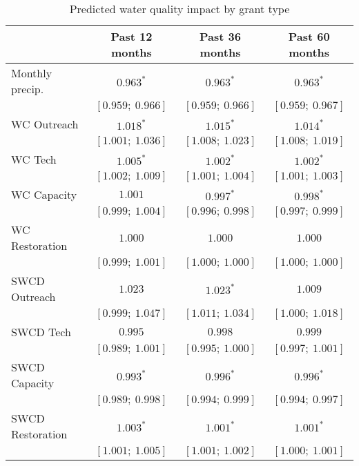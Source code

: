 
\begin{table}
\caption{Predicted water quality impact by grant type}
\begin{center}
\begin{tabular}{l c c c }
\hline
                       & Past 12 months & Past 36 months & Past 60 months \\
\hline
Monthly precip.        & $0.963^{*}$       & $0.963^{*}$       & $0.963^{*}$       \\
                       & $[0.959;\ 0.966]$ & $[0.959;\ 0.966]$ & $[0.959;\ 0.967]$ \\
WC Outreach            & $1.018^{*}$       & $1.015^{*}$       & $1.014^{*}$       \\
                       & $[1.001;\ 1.036]$ & $[1.008;\ 1.023]$ & $[1.008;\ 1.019]$ \\
WC Tech                & $1.005^{*}$       & $1.002^{*}$       & $1.002^{*}$       \\
                       & $[1.002;\ 1.009]$ & $[1.001;\ 1.004]$ & $[1.001;\ 1.003]$ \\
WC Capacity            & $1.001$           & $0.997^{*}$       & $0.998^{*}$       \\
                       & $[0.999;\ 1.004]$ & $[0.996;\ 0.998]$ & $[0.997;\ 0.999]$ \\
WC Restoration         & $1.000$           & $1.000$           & $1.000$           \\
                       & $[0.999;\ 1.001]$ & $[1.000;\ 1.000]$ & $[1.000;\ 1.000]$ \\
SWCD Outreach          & $1.023$           & $1.023^{*}$       & $1.009$           \\
                       & $[0.999;\ 1.047]$ & $[1.011;\ 1.034]$ & $[1.000;\ 1.018]$ \\
SWCD Tech              & $0.995$           & $0.998$           & $0.999$           \\
                       & $[0.989;\ 1.001]$ & $[0.995;\ 1.000]$ & $[0.997;\ 1.001]$ \\
SWCD Capacity          & $0.993^{*}$       & $0.996^{*}$       & $0.996^{*}$       \\
                       & $[0.989;\ 0.998]$ & $[0.994;\ 0.999]$ & $[0.994;\ 0.997]$ \\
SWCD Restoration       & $1.003^{*}$       & $1.001^{*}$       & $1.001^{*}$       \\
                       & $[1.001;\ 1.005]$ & $[1.001;\ 1.002]$ & $[1.000;\ 1.001]$ \\

\end{tabular}
\end{center}
\end{table}
